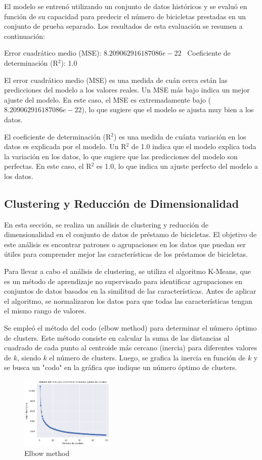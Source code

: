 \documentclass{wsdcr}
\begin{document}
El modelo se entrenó utilizando un conjunto de datos históricos y se evaluó en función de su capacidad para predecir el número de bicicletas prestadas en un conjunto de prueba separado. Los resultados de esta evaluación se resumen a continuación:

Error cuadrático medio (MSE): $8.209062916187086e-22$ \
Coeficiente de determinación (R$^2$): 1.0

El error cuadrático medio (MSE) es una medida de cuán cerca están las predicciones del modelo a los valores reales. Un MSE más bajo indica un mejor ajuste del modelo. En este caso, el MSE es extremadamente bajo ($8.209062916187086e-22$), lo que sugiere que el modelo se ajusta muy bien a los datos.

El coeficiente de determinación (R$^2$) es una medida de cuánta variación en los datos es explicada por el modelo. Un R$^2$ de 1.0 indica que el modelo explica toda la variación en los datos, lo que sugiere que las predicciones del modelo son perfectas. En este caso, el R$^2$ es 1.0, lo que indica un ajuste perfecto del modelo a los datos.

\subsection{Clustering y Reducción de Dimensionalidad}

En esta sección, se realiza un análisis de clustering y reducción de dimensionalidad en el conjunto de datos de préstamo de bicicletas. El objetivo de este análisis es encontrar patrones o agrupaciones en los datos que puedan ser útiles para comprender mejor las características de los préstamos de bicicletas.

Para llevar a cabo el análisis de clustering, se utiliza el algoritmo K-Means, que es un método de aprendizaje no supervisado para identificar agrupaciones en conjuntos de datos basados en la similitud de las características. Antes de aplicar el algoritmo, se normalizaron los datos para que todas las características tengan el mismo rango de valores.

Se empleó el método del codo (elbow method) para determinar el número óptimo de clusters. Este método consiste en calcular la suma de las distancias al cuadrado de cada punto al centroide más cercano (inercia) para diferentes valores de $k$, siendo $k$ el número de clusters. Luego, se grafica la inercia en función de $k$ y se busca un "codo" en la gráfica que indique un número óptimo de clusters.

\begin{figure}[h]
    \centering
    \includegraphics[width=0.4\textwidth]{charts/elbow_method_optimum_value.png}
    \caption{Elbow method}
    \label{fig:elbowmethod}
\end{figure}
\end{document}
